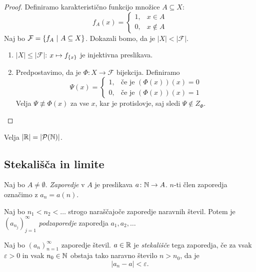 \documentclass[12pt, a4paper]{article}
\begin{document}
\begin{proof}
Definiramo karakteristično funkcijo množice $A\subseteq X$:
\[
f_A(x)=\begin{cases}
1, &x\in A\\
0, &x\not\in A
\end{cases}
\]
Naj bo $\mathcal{F}=\left\{f_A~\middle\vert~A\subseteq X\right\}$. Dokazali bomo, da je $|X|<|\mathcal{F}|$.

\begin{enumerate}[label=\roman*)]
\item $|X|\leq|\mathcal{F}|$: $x\mapsto f_{\left\{x\right\}}$ je injektivna preslikava.
\item Predpostavimo, da je $\Phi:X\to\mathcal{F}$ bijekcija. Definiramo
\[
\Psi(x)=\begin{cases}
1, &\text{če je $(\Phi(x))(x)=0$}\\
0, &\text{če je $(\Phi(x))(x)=1$}
\end{cases}
\]
Velja $\Psi\not\equiv\Phi(x)$ za vse $x$, kar je protislovje, saj sledi $\Psi\not\in Z_{\Phi}$.\qedhere
\end{enumerate}
\end{proof}

\begin{opomba}
Velja $|\mathbb{R}|=|\mathcal{P}(\mathbb{N})|$.
\end{opomba}

\newpage

\subsection{Stekališča in limite}

\begin{okvir}
\begin{definicija}
Naj bo $A\ne\emptyset$. \emph{Zaporedje} v $A$ je preslikava $a\colon \mathbb{N}\to A$. $n$-ti člen zaporedja označimo z $a_n=a(n)$.
\end{definicija}
\end{okvir}

\begin{definicija}
Naj bo $n_1<n_2<\dots$ strogo naraščajoče zaporedje naravnih števil. Potem je $(a_{n_j})_{j=1}^\infty$ \emph{podzaporedje} zaporedja $a_1,a_2,\dots$
\end{definicija}

\begin{definicija}
Naj bo $(a_n)_{n=1}^\infty$ zaporedje števil. $a\in\mathbb{R}$ je \emph{stekališče} tega zaporedja, če za vsak $\varepsilon>0$ in vsak $n_0\in\mathbb{N}$ obstaja tako naravno število $n>n_0$, da je
\[
|a_n-a|<\varepsilon.
\]
\end{definicija}
\end{document}
